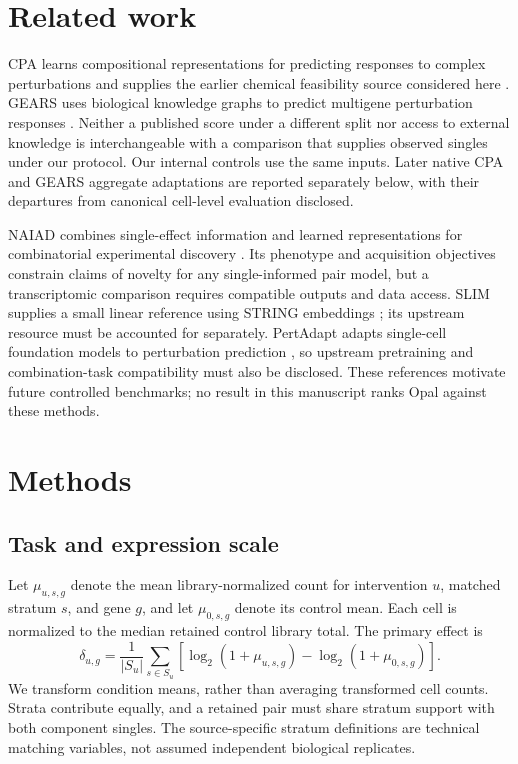 \documentclass{article}
\begin{document}
\section{Related work}
CPA learns compositional representations for predicting responses to complex perturbations and supplies the earlier chemical feasibility source considered here \citep{cpa2023}. GEARS uses biological knowledge graphs to predict multigene perturbation responses \citep{gears2024}. Neither a published score under a different split nor access to external knowledge is interchangeable with a comparison that supplies observed singles under our protocol. Our internal controls use the same inputs. Later native CPA and GEARS aggregate adaptations are reported separately below, with their departures from canonical cell-level evaluation disclosed.

NAIAD combines single-effect information and learned representations for combinatorial experimental discovery \citep{naiad2025}. Its phenotype and acquisition objectives constrain claims of novelty for any single-informed pair model, but a transcriptomic comparison requires compatible outputs and data access. SLIM supplies a small linear reference using STRING embeddings \citep{slim2026}; its upstream resource must be accounted for separately. PertAdapt adapts single-cell foundation models to perturbation prediction \citep{pertadapt2026}, so upstream pretraining and combination-task compatibility must also be disclosed. These references motivate future controlled benchmarks; no result in this manuscript ranks Opal against these methods.

\section{Methods}
\subsection{Task and expression scale}
Let $\mu_{u,s,g}$ denote the mean library-normalized count for intervention $u$, matched stratum $s$, and gene $g$, and let $\mu_{0,s,g}$ denote its control mean. Each cell is normalized to the median retained control library total. The primary effect is
\begin{equation}
\delta_{u,g}=\frac{1}{|S_u|}\sum_{s\in S_u}\left[\log_2(1+\mu_{u,s,g})-\log_2(1+\mu_{0,s,g})\right].
\end{equation}
We transform condition means, rather than averaging transformed cell counts. Strata contribute equally, and a retained pair must share stratum support with both component singles. The source-specific stratum definitions are technical matching variables, not assumed independent biological replicates.
\end{document}
